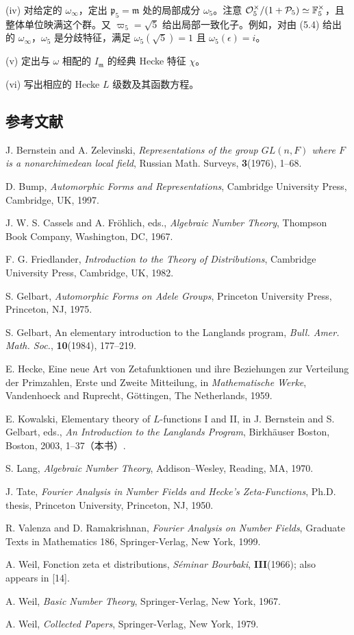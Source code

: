 (iv) 对给定的 $\omega_\infty$，定出 $\mathfrak p_5=\mathfrak m$ 处的局部成分 $\omega_5$。注意 $\mathcal{O}_5^\times/(1+\mathcal P_5)\simeq\mathbb F_5^\times$，且整体单位映满这个群。又 $\varpi_5=\sqrt5$ 给出局部一致化子。例如，对由 (5.4) 给出的 $\omega_\infty$，$\omega_5$ 是分歧特征，满足 $\omega_5(\sqrt5)=1$ 且 $\omega_5(\epsilon)=i$。

(v) 定出与 $\omega$ 相配的 $I_{\mathfrak m}$ 的经典 Hecke 特征 $\chi$。

(vi) 写出相应的 Hecke $L$ 级数及其函数方程。

\subsection*{参考文献}

\begin{enumerate}[label={[\arabic*]},leftmargin=2.8em,itemsep=0.35em]
\item J. Bernstein and A. Zelevinski, \emph{Representations of the group $GL(n,F)$ where $F$ is a nonarchimedean local field}, Russian Math. Surveys, \textbf{3}(1976), 1--68.
\item D. Bump, \emph{Automorphic Forms and Representations}, Cambridge University Press, Cambridge, UK, 1997.
\item J. W. S. Cassels and A. Fr\"ohlich, eds., \emph{Algebraic Number Theory}, Thompson Book Company, Washington, DC, 1967.
\item F. G. Friedlander, \emph{Introduction to the Theory of Distributions}, Cambridge University Press, Cambridge, UK, 1982.
\item S. Gelbart, \emph{Automorphic Forms on Adele Groups}, Princeton University Press, Princeton, NJ, 1975.
\item S. Gelbart, An elementary introduction to the Langlands program, \emph{Bull. Amer. Math. Soc.}, \textbf{10}(1984), 177--219.
\item E. Hecke, Eine neue Art von Zetafunktionen und ihre Beziehungen zur Verteilung der Primzahlen, Erste und Zweite Mitteilung, in \emph{Mathematische Werke}, Vandenhoeck and Ruprecht, G\"ottingen, The Netherlands, 1959.
\item E. Kowalski, Elementary theory of $L$-functions I and II, in J. Bernstein and S. Gelbart, eds., \emph{An Introduction to the Langlands Program}, Birkh\"auser Boston, Boston, 2003, 1--37（本书）.
\item S. Lang, \emph{Algebraic Number Theory}, Addison--Wesley, Reading, MA, 1970.
\item J. Tate, \emph{Fourier Analysis in Number Fields and Hecke's Zeta-Functions}, Ph.D. thesis, Princeton University, Princeton, NJ, 1950.
\item R. Valenza and D. Ramakrishnan, \emph{Fourier Analysis on Number Fields}, Graduate Texts in Mathematics 186, Springer-Verlag, New York, 1999.
\item A. Weil, Fonction zeta et distributions, \emph{S\'eminar Bourbaki}, \textbf{III}(1966); also appears in [14].
\item A. Weil, \emph{Basic Number Theory}, Springer-Verlag, New York, 1967.
\item A. Weil, \emph{Collected Papers}, Springer-Verlag, New York, 1979.
\end{enumerate}
